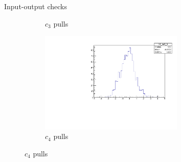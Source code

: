 \documentclass{beamer}
\begin{document}
\begin{frame}{Input-output checks}
\begin{figure}
\begin{subfigure}{0.5\textwidth}
      \caption{$c_3$ pulls}
    \end{subfigure}%
    \begin{subfigure}{0.5\textwidth}
      \centering
      \includegraphics[width=0.75\textwidth,trim={0 0 0 0},clip=true]{Plots/c4_ToyFits_pull.pdf}
      \caption{$c_4$ pulls}
    \end{subfigure}
  \end{figure}
\end{frame}
\end{document}
